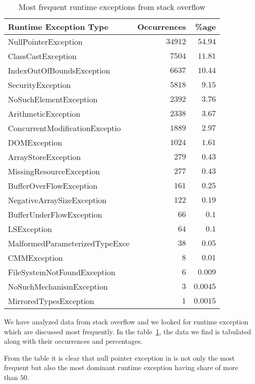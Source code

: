 \begin{table}[t]
\small
\begin{tabular}{l|r|r}
\textbf{Runtime Exception Type} & \textbf{Occurrences} & \textbf{\%age}\\
\hline
NullPointerException & $34912$ & $54.94$ \\
ClassCastException & $7504$ & $11.81$ \\
IndexOutOfBoundsException & $6637$ & $10.44$ \\
SecurityException  & $5818$ & $9.15$ \\
NoSuchElementException & $2392$ & $3.76$ \\
ArithmeticException & $2338$ & $3.67$ \\
ConcurrentModificationExceptio & $1889$ & $2.97$ \\
DOMException & $1024$ & $1.61$ \\
ArrayStoreException & $279$ & $0.43$ \\
MissingResourceException & $277$ & $0.43$ \\
BufferOverFlowException & $161$ & $0.25$ \\
NegativeArraySizeException & $122$ & $0.19$ \\
BufferUnderFlowException & $66$ & $0.1$ \\
LSException & $64$ &  $0.1$ \\
MalformedParameterizedTypeExce & $38$ & $0.05$ \\
CMMException  & $8$ & $0.01$ \\
FileSystemNotFoundException & $6$ & $0.009$ \\
NoSuchMechanismException & $3$ & $0.0045$ \\
MirroredTypesException & $1$ & $0.0015$
\end{tabular}
\caption{Most frequent runtime exceptions from stack overflow}
\label{tab:stackoverlow}
\end{table}

We have analyzed data from stack overflow and we looked for \java runtime
exception which are discussed most frequently. In the
table~\ref{tab:stackoverlow}, the data we find is tabulated along with their
occurrences and percentages.

From the table it is clear that null pointer exception in \java is not only the
most frequent but also the most dominant runtime exception having share of more
than $50$.